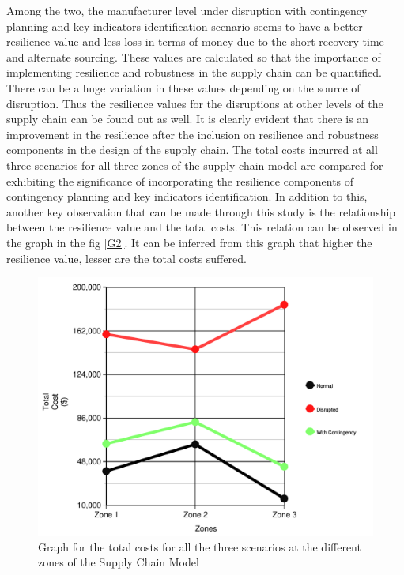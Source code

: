 \newpage
Among the two, the manufacturer level under disruption with contingency planning and key indicators identification scenario seems to have a better resilience value and less loss in terms of money due to the short recovery time and alternate sourcing. These values are calculated so that the importance of implementing resilience and robustness in the supply chain can be quantified. There can be a huge variation in these values depending on the source of disruption. Thus the resilience values for the disruptions at other levels of the supply chain can be found out as well. It is clearly evident that there is an improvement in the resilience after the inclusion on resilience and robustness components in the design of the supply chain. The total costs incurred at all three scenarios for all three zones of the supply chain model are compared for exhibiting the significance of incorporating the resilience components of contingency planning and key indicators identification. In addition to this, another key observation that can be made through this study is the relationship between the resilience value and the total costs. This relation can be observed in the graph in the fig \ref{G2}. It can be inferred from this graph that higher the resilience value, lesser are the total costs suffered.




\begin{figure}[H]
  \centering
  \includegraphics[width=6.5in]{figures/pdf/TotalCosts.pdf}
  \caption{Graph for the total costs for all the three scenarios at the different zones of the Supply Chain Model}\label{G1}
\end{figure}  

